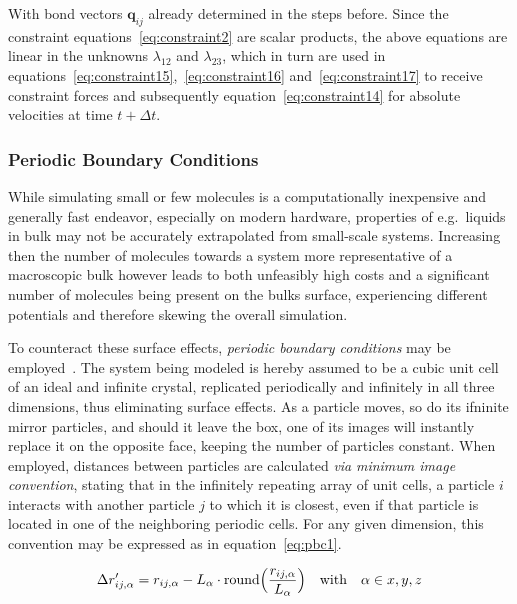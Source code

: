 \documentclass[11pt]{article}
\begin{document}
\bigskip

\noindent With bond vectors $\mathbf{q}_{ij}$ already determined in the steps before. Since the constraint equations~\ref{eq:constraint2} are scalar products, the above equations are linear in the unknowns $\lambda_{12}$ and $\lambda_{23}$, which in turn are used in equations~\ref{eq:constraint15},~\ref{eq:constraint16} and~\ref{eq:constraint17} to receive constraint forces and subsequently equation~\ref{eq:constraint14} for absolute velocities at time $t + \Delta t$.

\subsubsection{Periodic Boundary Conditions}\label{periodic}
While simulating small or few molecules is a computationally inexpensive and generally fast endeavor, especially on modern hardware, properties of e.g.~liquids in bulk may not be accurately extrapolated from small-scale systems. Increasing then the number of molecules towards a system more representative of a macroscopic bulk however leads to both unfeasibly high costs and a significant number of molecules being present on the bulks surface, experiencing different potentials and therefore skewing the overall simulation.
\\ \par \noindent To counteract these surface effects, \textit{periodic boundary conditions} may be employed~\cite{Allen2017,Cramer2004-vy,Tuckerman2010}. The system being modeled is hereby assumed to be a cubic unit cell of an ideal and infinite crystal, replicated periodically and infinitely in all three dimensions, thus eliminating surface effects. As a particle moves, so do its ifninite mirror particles, and should it leave the box, one of its images will instantly replace it on the opposite face, keeping the number of particles constant. When employed, distances between particles are calculated \textit{via} \textit{minimum image convention}, stating that in the infinitely repeating array of unit cells, a particle $i$ interacts with another particle $j$ to which it is closest, even if that particle is located in one of the neighboring periodic cells. For any given dimension, this convention may be expressed as in equation~\ref{eq:pbc1}.

\begin{equation}
  \Delta r_{ij,\alpha}' = r_{ij,\alpha} - L_\alpha\cdot \text{round}\Bigl(\frac{r_{ij,\alpha}}{L_\alpha}\Bigr) \quad \text{with} \quad \alpha \in x, y, z
  \label{eq:pbc1}
\end{equation}
\end{document}
